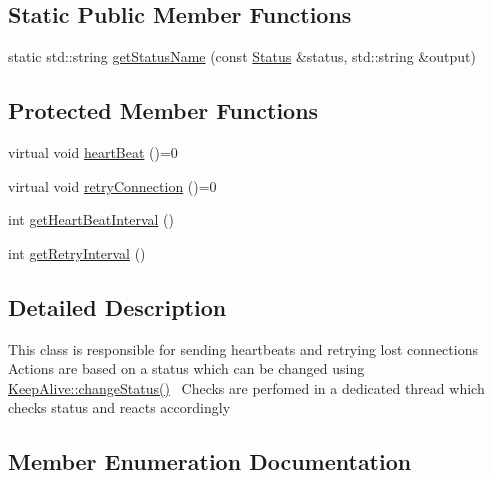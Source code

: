 \subsection*{Static Public Member Functions}
\begin{DoxyCompactItemize}
\item 
static std\+::string \hyperlink{classMetal_1_1KeepAlive_a701c68654a7d52327e4233b2b06cd708}{get\+Status\+Name} (const \hyperlink{classMetal_1_1KeepAlive_ac47e726ea693a76d0779c0bf29ee7038}{Status} \&status, std\+::string \&output)
\end{DoxyCompactItemize}
\subsection*{Protected Member Functions}
\begin{DoxyCompactItemize}
\item 
virtual void \hyperlink{classMetal_1_1KeepAlive_afbc7886ac1ce05daadca60c6c75eef84}{heart\+Beat} ()=0
\item 
virtual void \hyperlink{classMetal_1_1KeepAlive_a16379cf581c5b0d097b3258970724895}{retry\+Connection} ()=0
\item 
int \hyperlink{classMetal_1_1KeepAlive_a295dbe169bafefaf8e6af0bd981077e7}{get\+Heart\+Beat\+Interval} ()
\item 
int \hyperlink{classMetal_1_1KeepAlive_a6037eb7ab5caba718cc5d78b60aba8d4}{get\+Retry\+Interval} ()
\end{DoxyCompactItemize}


\subsection{Detailed Description}
This class is responsible for sending heartbeats and retrying lost connections~\newline
 Actions are based on a status which can be changed using \hyperlink{classMetal_1_1KeepAlive_a3b499808ace15ca0c9935ebd3f8bf90a}{Keep\+Alive\+::change\+Status()}~\newline
 Checks are perfomed in a dedicated thread which checks status and reacts accordingly 

\subsection{Member Enumeration Documentation}
\hypertarget{classMetal_1_1KeepAlive_ac47e726ea693a76d0779c0bf29ee7038}{}
